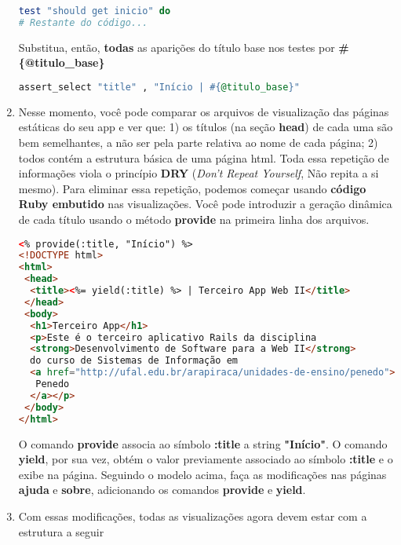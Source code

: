 \documentclass[a4paper,12pt]{article}
\begin{document}
\begin{enumerate}
\begin{lstlisting}[language=Ruby, title={test/controllers/paginas\_estaticas\_controller\_test.rb}, basicstyle=\scriptsize]
test "should get inicio" do
# Restante do código...
  \end{lstlisting}

  Substitua, então, \textbf{todas} as aparições do título base nos testes por \textbf{\#\{@titulo\_base\}}

  \begin{lstlisting}[language=Ruby, title={test/controllers/paginas\_estaticas\_controller\_test.rb}, basicstyle=\scriptsize]
assert_select "title" , "Início | #{@titulo_base}"
  \end{lstlisting}

  \item Nesse momento, você pode comparar os arquivos de visualização das páginas estáticas do seu app e ver que: 1) os títulos (na seção \textbf{head}) de cada uma são bem semelhantes, a não ser pela parte relativa ao nome de cada página; 2) todos contém a estrutura básica de uma página html. Toda essa repetição de informações viola o princípio \textbf{DRY} (\textit{Don't Repeat Yourself}, Não repita a si mesmo). Para eliminar essa repetição, podemos começar usando \textbf{código Ruby embutido} nas visualizações. Você pode introduzir a geração dinâmica de cada título usando o método \textbf{provide} na primeira linha dos arquivos.

  \begin{lstlisting}[language=html, title=app/views/paginas\_estaticas/inicio.html.erb, basicstyle=\scriptsize]
<% provide(:title, "Início") %>
<!DOCTYPE html>
<html>
 <head>
  <title><%= yield(:title) %> | Terceiro App Web II</title>
 </head>
 <body>
  <h1>Terceiro App</h1>
  <p>Este é o terceiro aplicativo Rails da disciplina
  <strong>Desenvolvimento de Software para a Web II</strong>
  do curso de Sistemas de Informação em
  <a href="http://ufal.edu.br/arapiraca/unidades-de-ensino/penedo">
   Penedo
  </a></p>
 </body>
</html>
  \end{lstlisting}

  O comando \textbf{provide} associa ao símbolo \textbf{:title} a string \textbf{"Início"}. O comando \textbf{yield}, por sua vez, obtém o valor previamente associado ao símbolo \textbf{:title} e o exibe na página. Seguindo o modelo acima, faça as modificações nas páginas \textbf{ajuda} e \textbf{sobre}, adicionando os comandos \textbf{provide} e \textbf{yield}.

  \item Com essas modificações, todas as visualizações agora devem estar com a estrutura a seguir


\end{enumerate}
\end{document}
